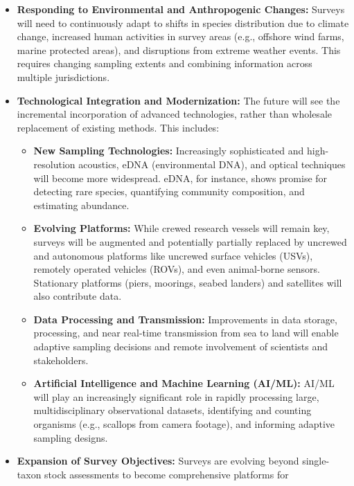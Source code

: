 \documentclass[
  letterpaper,
  oneside,
  open=any]{scrbook}
\providecommand{\tightlist}{%
  \setlength{\itemsep}{0pt}\setlength{\parskip}{0pt}}\usepackage{longtable,booktabs,array}
\begin{document}
\begin{itemize}
\tightlist
\item
  \textbf{Responding to Environmental and Anthropogenic Changes:}
  Surveys will need to continuously adapt to shifts in species
  distribution due to climate change, increased human activities in
  survey areas (e.g., offshore wind farms, marine protected areas), and
  disruptions from extreme weather events. This requires changing
  sampling extents and combining information across multiple
  jurisdictions.
\item
  \textbf{Technological Integration and Modernization:} The future will
  see the incremental incorporation of advanced technologies, rather
  than wholesale replacement of existing methods. This includes:

  \begin{itemize}
  \tightlist
  \item
    \textbf{New Sampling Technologies:} Increasingly sophisticated and
    high-resolution acoustics, eDNA (environmental DNA), and optical
    techniques will become more widespread. eDNA, for instance, shows
    promise for detecting rare species, quantifying community
    composition, and estimating abundance.
  \item
    \textbf{Evolving Platforms:} While crewed research vessels will
    remain key, surveys will be augmented and potentially partially
    replaced by uncrewed and autonomous platforms like uncrewed surface
    vehicles (USVs), remotely operated vehicles (ROVs), and even
    animal-borne sensors. Stationary platforms (piers, moorings, seabed
    landers) and satellites will also contribute data.
  \item
    \textbf{Data Processing and Transmission:} Improvements in data
    storage, processing, and near real-time transmission from sea to
    land will enable adaptive sampling decisions and remote involvement
    of scientists and stakeholders.
  \item
    \textbf{Artificial Intelligence and Machine Learning (AI/ML):} AI/ML
    will play an increasingly significant role in rapidly processing
    large, multidisciplinary observational datasets, identifying and
    counting organisms (e.g., scallops from camera footage), and
    informing adaptive sampling designs.
  \end{itemize}
\item
  \textbf{Expansion of Survey Objectives:} Surveys are evolving beyond
  single-taxon stock assessments to become comprehensive platforms for

\end{itemize}
\end{document}
